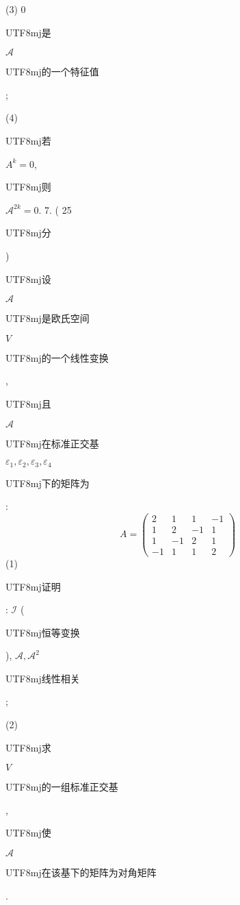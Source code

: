 \documentclass[10pt]{article}
\begin{document}
(3) 0 \begin{CJK}{UTF8}{mj}是\end{CJK} $\mathscr{A}$ \begin{CJK}{UTF8}{mj}的一个特征值\end{CJK};

(4) \begin{CJK}{UTF8}{mj}若\end{CJK} $A^{k}=0$, \begin{CJK}{UTF8}{mj}则\end{CJK} $\mathscr{A}^{2 k}=0$. 7. ( 25 \begin{CJK}{UTF8}{mj}分\end{CJK}) \begin{CJK}{UTF8}{mj}设\end{CJK} $\mathscr{A}$ \begin{CJK}{UTF8}{mj}是欧氏空间\end{CJK} $V$ \begin{CJK}{UTF8}{mj}的一个线性变换\end{CJK}, \begin{CJK}{UTF8}{mj}且\end{CJK} $\mathscr{A}$ \begin{CJK}{UTF8}{mj}在标准正交基\end{CJK} $\varepsilon_{1}, \varepsilon_{2}, \varepsilon_{3}, \varepsilon_{4}$ \begin{CJK}{UTF8}{mj}下的矩阵为\end{CJK}:
$$
A=\left(\begin{array}{cccc}
2 & 1 & 1 & -1 \\
1 & 2 & -1 & 1 \\
1 & -1 & 2 & 1 \\
-1 & 1 & 1 & 2
\end{array}\right)
$$
(1) \begin{CJK}{UTF8}{mj}证明\end{CJK}: $\mathscr{I}$ (\begin{CJK}{UTF8}{mj}恒等变换\end{CJK}), $\mathscr{A}, \mathscr{A}^{2}$ \begin{CJK}{UTF8}{mj}线性相关\end{CJK};

(2) \begin{CJK}{UTF8}{mj}求\end{CJK} $V$ \begin{CJK}{UTF8}{mj}的一组标准正交基\end{CJK}, \begin{CJK}{UTF8}{mj}使\end{CJK} $\mathscr{A}$ \begin{CJK}{UTF8}{mj}在该基下的矩阵为对角矩阵\end{CJK}.
\end{document}
